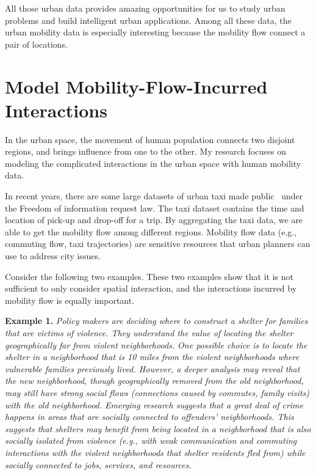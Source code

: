 All those urban data provides amazing opportunities for us to study urban problems and build intelligent urban applications. Among all these data, the urban mobility data is especially interesting because the mobility flow connect a pair of locations. 


\section{Model Mobility-Flow-Incurred Interactions}


In the urban space, the movement of human population connects two disjoint regions, and brings influence from one to the other. My research focuses on modeling the complicated interactions in the urban space with human mobility data.  


In recent years, there are some large datasets of urban taxi made public~\cite{nyctaxi} under the Freedom of information request law.  The taxi dataset contains the time and location of pick-up and drop-off for a trip. By aggregating the taxi data, we are able to get the mobility flow among different regions.
Mobility flow data (e.g., commuting flow, taxi trajectories) are sensitive resources that urban planners can use to address city issues.




Consider the following two examples. These two examples show that it is not sufficient to only consider spatial interaction, and the interactions incurred by mobility flow is equally important.


\textbf{Example 1.} \emph{Policy makers are deciding where to construct a shelter for families that are victims of violence. They understand the value of locating the shelter geographically far from violent neighborhoods. One possible choice is to locate the shelter in a neighborhood that is 10 miles from the violent neighborhoods where vulnerable families previously lived. However, a deeper analysis may reveal that the new neighborhood, though geographically removed from the old neighborhood, may still have strong social flows (connections caused by commutes, family visits) with the old neighborhood. Emerging research suggests that a great deal of crime happens in areas that are socially connected to offenders' neighborhoods. This suggests that shelters may benefit from being located in a neighborhood that is also socially isolated from violence (e.g., with weak communication and commuting interactions with the violent neighborhoods that shelter residents fled from) while socially connected to jobs, services, and resources.}


